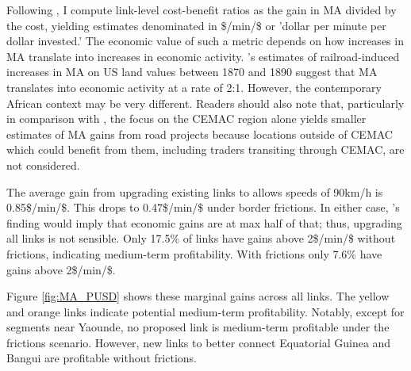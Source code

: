 \documentclass[a4paper]{article}
\begin{document}
Following \citet{krantz2024optimal}, I compute link-level cost-benefit ratios as the gain in MA divided by the cost, yielding estimates denominated in \$/min/\$ or 'dollar per minute per dollar invested.' The economic value of such a metric depends on how increases in MA translate into increases in economic activity. \citet{donaldson2016railroads}'s estimates of railroad-induced increases in MA on US land values between 1870 and 1890 suggest that MA translates into economic activity at a rate of 2:1. However, the contemporary African context may be very different. Readers should also note that, particularly in comparison with \citet{krantz2024optimal}, the focus on the CEMAC region alone yields smaller estimates of MA gains from road projects because locations outside of CEMAC which could benefit from them, including traders transiting through CEMAC, are not considered. \newline 

The average gain from upgrading existing links to allows speeds of 90km/h is 0.85\$/min/\$. This drops to 0.47\$/min/\$ under border frictions. In either case, \citet{donaldson2016railroads}'s finding would imply that economic gains are at max half of that; thus, upgrading all links is not sensible. Only 17.5\% of links have gains above 2\$/min/\$ without frictions, indicating medium-term profitability. With frictions only 7.6\% have gains above 2\$/min/\$. \newline 

Figure \ref{fig:MA_PUSD} shows these marginal gains across all links. The yellow and orange links indicate potential medium-term profitability. Notably, except for segments near Yaounde, no proposed link is medium-term profitable under the frictions scenario. However, new links to better connect Equatorial Guinea and Bangui are profitable without frictions. \newline
\end{document}
